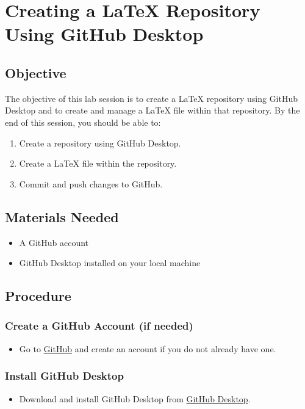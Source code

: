 \section{Creating a LaTeX Repository Using GitHub Desktop}

\subsection{Objective}  %
The objective of this lab session is to create a LaTeX repository using GitHub Desktop and to create and manage a LaTeX file within that repository. By the end of this session, you should be able to:

\begin{enumerate}
    \item Create a repository using GitHub Desktop.
    \item Create a LaTeX file within the repository.
    \item Commit and push changes to GitHub.
\end{enumerate}

\subsection{Materials Needed}  %
\begin{itemize}
    \item A GitHub account
    \item GitHub Desktop installed on your local machine
\end{itemize}

\subsection{Procedure}  %

\subsubsection{Create a GitHub Account (if needed)}  %
\begin{itemize}
    \item Go to \href{https://github.com}{GitHub} and create an account if you do not already have one.
\end{itemize}

\subsubsection{Install GitHub Desktop}  %
\begin{itemize}
    \item Download and install GitHub Desktop from \href{https://desktop.github.com}{GitHub Desktop}.
\end{itemize}

